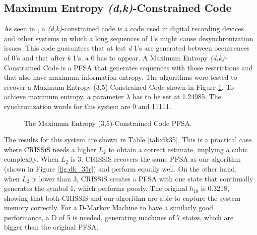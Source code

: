 {\subsection{Maximum Entropy \textit{(d,k)}-Constrained Code}

As seen in \cite{immink.98}, a \textit{(d,k)}-constrained code is a code used in digital recording devices and other systems in which a long sequences of 1's might cause desynchronization issues. This code guarantees that at lest \textit{d} 1's are generated between occurrences of 0's and that after \textit{k} 1's, a 0 has to appear. A Maximum Entropy \textit{(d,k)}-Constrained Code is a PFSA that generates sequences with those restrictions and that also have maximum information entropy. The algorithms were tested to recover a Maximum Entropy (3,5)-Constrained Code shown in Figure \ref{fig:dk_35}. To achieve maximum entropy, a parameter $\lambda$ has to be set at 1.24985. The synchronization words for this system are 0 and 11111.

\begin{figure}
\centering
{}
\caption{The Maximum Entropy (3,5)-Constrained Code PFSA.\label{fig:dk_35}}
\end{figure}

The results for this system are shown in Table \ref{tab:dk35}. This is a practical case where CRISSiS needs a higher $L_2$ to obtain a correct estimate, implying a cubic complexity. When $L_2$ is 3, CRISSiS recovers the same PFSA as our algorithm (shown in Figure \ref{fig:dk_35r}) and perform equally well. On the other hand, when $L_2$ is lower than 3, CRISSiS creates a PFSA with one state that continually generates the symbol 1, which performs poorly. The original $h_{10}$ is 0.3218, showing that both CRISSiS and our algorithm are able to capture the system memory correctly. For a D-Markov Machine to have a similarly good performance, a D of 5 is needed, generating machines of 7 states, which are bigger than the original PFSA.

}
